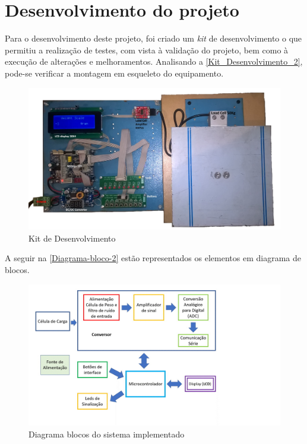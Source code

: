 \chapter{Desenvolvimento do projeto}
Para o desenvolvimento deste projeto, foi criado um \textit{kit} de desenvolvimento o que permitiu a realização de testes, com vista à validação do projeto, bem como à execução de alterações e melhoramentos.
\emptyline
Analisando a \autoref{Kit_Desenvolvimento_2}, pode-se verificar a montagem em esqueleto do equipamento.
\\
\begin{figure}[H]
	\centering
	\includegraphics[scale=0.12]{./image/PESTA/kit/Kit_Desenvolvimento_2.jpg}
	\caption{Kit de Desenvolvimento}
	\label{Kit_Desenvolvimento_2}
\end{figure}
A seguir na \autoref{Diagrama-bloco-2} estão representados os elementos em diagrama de blocos.
\\
\begin{figure}[H]
	\centering
	\includegraphics[scale=0.5]{./image/PESTA/Diagrama/Diagrama-bloco-2.jpg}
	\caption{Diagrama blocos do sistema implementado}
	\label{Diagrama-bloco-2}
\end{figure}
